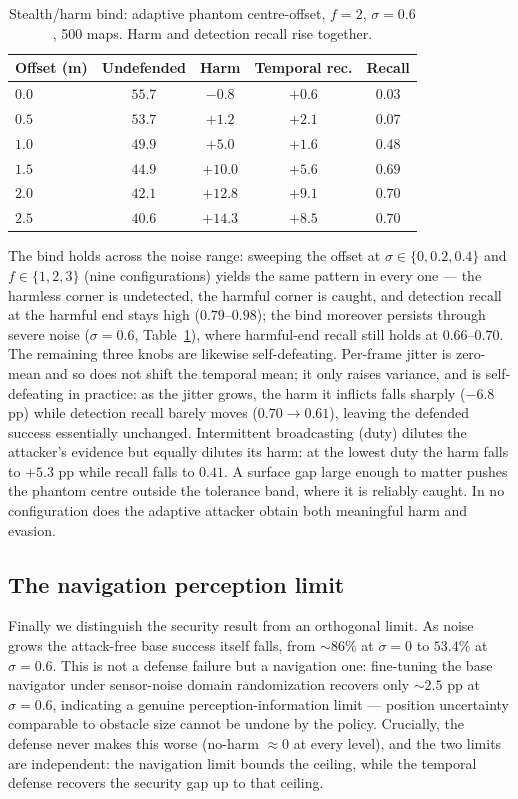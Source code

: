 \begin{table}[t]\centering
\caption{Stealth/harm bind: adaptive phantom centre-offset, $f=2$,
$\sigma=0.6$, 500 maps. Harm and detection recall rise together.}
\label{tab:bind}
\begin{tabular}{lcccc}
\toprule
Offset (m) & Undefended & Harm & Temporal rec. & Recall\\
\midrule
$0.0$ & $55.7$ & $-0.8$ & $+0.6$ & $0.03$\\
$0.5$ & $53.7$ & $+1.2$ & $+2.1$ & $0.07$\\
$1.0$ & $49.9$ & $+5.0$ & $+1.6$ & $0.48$\\
$1.5$ & $44.9$ & $+10.0$& $+5.6$ & $0.69$\\
$2.0$ & $42.1$ & $+12.8$& $+9.1$ & $0.70$\\
$2.5$ & $40.6$ & $+14.3$& $+8.5$ & $0.70$\\
\bottomrule
\end{tabular}
\end{table}

The bind holds across the noise range: sweeping the offset at
$\sigma\in\{0,0.2,0.4\}$ and $f\in\{1,2,3\}$ (nine configurations) yields
the same pattern in every one --- the harmless corner is undetected, the
harmful corner is caught, and detection recall at the harmful end stays high
($0.79$--$0.98$); the bind moreover persists through severe noise
($\sigma=0.6$, Table~\ref{tab:bind}), where harmful-end recall still holds at
$0.66$--$0.70$. The remaining three knobs are likewise self-defeating.
Per-frame jitter is zero-mean and so does not shift the temporal mean; it
only raises variance, and is self-defeating in practice: as the jitter grows,
the harm it inflicts falls sharply ($-6.8$ pp) while detection recall barely
moves ($0.70\to0.61$), leaving the defended success essentially unchanged.
Intermittent broadcasting (duty) dilutes the attacker's evidence but equally
dilutes its harm: at the lowest duty the harm falls to $+5.3$ pp while recall
falls to $0.41$. A surface gap large
enough to matter pushes the phantom centre outside the tolerance band, where
it is reliably caught. In no configuration does the adaptive attacker obtain
both meaningful harm and evasion.

\subsection{The navigation perception limit}\label{sec:res-limit}
Finally we distinguish the security result from an orthogonal limit. As
noise grows the attack-free base success itself falls, from $\sim\!86\%$ at
$\sigma=0$ to $53.4\%$ at $\sigma=0.6$. This is not a defense failure but a
navigation one: fine-tuning the base navigator under sensor-noise domain
randomization recovers only $\sim\!2.5$ pp at $\sigma=0.6$, indicating a
genuine perception-information limit --- position uncertainty comparable to
obstacle size cannot be undone by the policy. Crucially, the defense never
makes this worse (no-harm $\approx0$ at every level), and the two limits are
independent: the navigation limit bounds the ceiling, while the temporal
defense recovers the security gap up to that ceiling.
